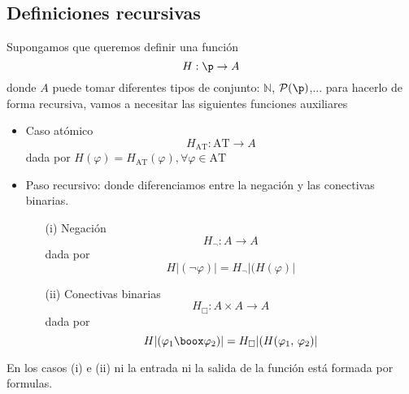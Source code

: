 \subsection*{Definiciones recursivas}
Supongamos que queremos definir una función 
\[ H: \p \rightarrow A \]
donde $A$ puede tomar diferentes tipos de conjunto: $\mathbb{N}$, $\mathcal{P}(\p)$,... para hacerlo de forma recursiva, vamos a necesitar las siguientes funciones auxiliares
\begin{itemize}
	\item Caso atómico
	\[ H_{\mbox{AT}}: \mbox{AT} \rightarrow A \]
dada por $H(\varphi)=H_{\mbox{AT}}(\varphi), \forall \varphi \in \mbox{AT}$
	\item Paso recursivo: donde diferenciamos entre la negación y las conectivas binarias. 
	\begin{itemize}
		\item[(i)] Negación 
		\[ H_{\lnot}: A \rightarrow A \]
		dada por 
	\[ H \vert (\lnot \varphi) \vert = H_{\lnot}\vert (H(\varphi) \vert \]
		\item[(ii)] Conectivas binarias 
		\[ H_{\Box}: A \times A \rightarrow A \]
		dada por 
	\[ H \vert (\varphi_1 \boox \varphi_2) \vert = H_{\Box}\vert (H(\varphi_1, \, \varphi_2) \vert \]
	\end{itemize}
\end{itemize} 
En los casos (i) e (ii) ni la entrada ni la salida de la función está formada por formulas. 
